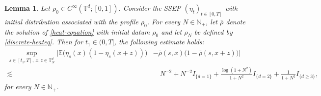 \documentclass[UTF-8,reqno]{amsart}
\numberwithin{equation}{section}
\newtheorem{lemma}[theorem]{Lemma}
\def\ge{\geqslant}
\def\ge{\geqslant}
\begin{document}
\begin{lemma}\label{error-rate}
Let $\rho_0 \in C^{\infty}(\mathbb{T}^d;[0,1])$. Consider the SSEP $(\eta_t)_{t \in [0,T]}$ with initial distribution associated with the profile $\rho_0$. For every $N\in\mathbb{N}_+$, let $\bar{\rho}$ denote the solution of \eqref{heat-equation} with initial datum $\rho_0$ and let $\rho_N$ be defined by \eqref{discrete-heateq}. Then for $t_1\in(0,T]$, the following estimate holds:
\begin{align*}
\sup_{s \in [t_1,T],\ x,z \in \mathbb{T}^d_N}\Big| \mathbb{E} \big( \eta_s(x)(1 - \eta_s(x+z)) \big)& - \bar{\rho}(s,x) \big( 1 - \bar{\rho}(s,x+z) \big) \Big|\\ 
\lesssim&\quad  N^{-2}+N^{-2}I_{\{d=1\}}+\frac{\log(1+N^2)}{1+N^2}I_{\{d=2\}}+\frac{1}{1+N^2}I_{\{d\ge3\}}, 
\end{align*}
for every $N \in \mathbb{N}_+$. 	
\end{lemma}
\end{document}
